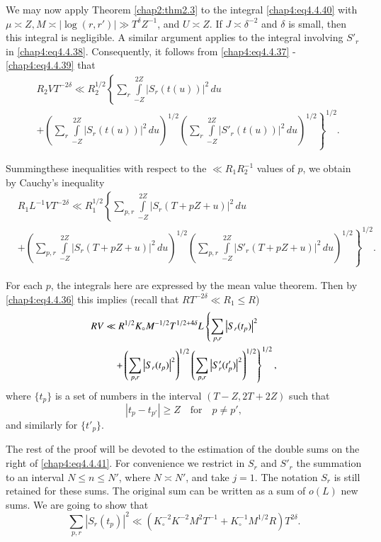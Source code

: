 We may now apply Theorem \ref{chap2:thm2.3} to the integral \eqref{chap4:eq4.4.40} with $\mu\asymp Z, M\asymp |\log(r,r')|\gg T^\delta Z^{-1}$, and $U\asymp Z$. If $J\asymp\delta^{-2}$ and $\delta$ is small, then this integral is negligible. A similar argument applies to the integral involving $S'_r$ in \eqref{chap4:eq4.4.38}. Consequently, it follows from \eqref{chap4:eq4.4.37} - \eqref{chap4:eq4.4.39} that 
\begin{align*}
& R_2VT^{-2\delta}\ll R_2^{1/2}\left\{\sum\limits_r\int\limits_{-Z}^{2Z}\left| S_r(t(u))\right|^2\,du\right.\\
& +\left.\left(\sum\limits_r\int\limits_{-Z}^{2Z}\left|S_r(t(u))\right|^2\,du \right)^{1/2}\left(\sum\limits_r\int\limits_{-Z}^{2Z}\left|S'_r(t(u))\right|^2\, du\right)^{1/2}\right\}^{1/2}.
\end{align*}

Summing\pageoriginale these inequalities with respect to the $\ll R_1R_2^{-1}$ values of $p$, we obtain by Cauchy's inequality
{\fontsize{10}{12}\selectfont
\begin{align*}
& R_1L^{-1}VT^{-2\delta}\ll R_1^{1/2}\left\{\sum\limits_{p,r}\int\limits_{-Z}^{2Z} \left|S_r(T+pZ+u)\right|^2\,du\right.\\
& +\left.\left(\sum\limits_{p,r}\int\limits_{-Z}^{2Z}\left|S_r(T+pZ+u)\right|^2 \, du\right)^{1/2}\left(\sum\limits_{p,r}\int\limits_{-Z}^{2Z}\left|S'_r(T+pZ+u) \right|^2\,du\right)^{1/2}\right\}^{1/2}.
\end{align*}}

For each $p$, the integrals here are expressed by the mean value theorem. Then by \eqref{chap4:eq4.4.36} this implies (recall that $RT^{-2\delta}\ll R_1\leq R$)
\begin{align}
RV & \ll R^{1/2}K_\circ M^{-1/2}T^{1/2+4\delta}L\left\{\sum\limits_{p,r}\left|S_r (t_p)\right|^2\right.\label{chap4:eq4.4.41}\\
&\quad \left.+\left(\sum\limits_{p,r}\left|S_r(t_p)\right|^2\right)^{1/2}\left( \sum\limits_{p,r}\left|S'_r(t'_p)\right|^2\right)^{1/2}\right\}^{1/2},\notag
\end{align}
where $\{t_p\}$ is a set of numbers in the interval $(T-Z,2T+2Z)$ such that 
\begin{equation}\label{chap4:eq4.4.42}
\left|t_p-t_{p'}\right|\geq Z\quad\text{for}\quad p\neq p',
\end{equation}
and similarly for $\{t'_p\}$. 

The rest of the proof will be devoted to the estimation of the double
sums on the right of \eqref{chap4:eq4.4.41}. For convenience we
restrict in $S_r$ and $S'_r$ the summation to an interval $N\leq n\leq
N'$, where $N\asymp N'$, and take $j=1$. The notation $S_r$ is still
retained for these sums. The original sum can be written as a sum of
$o(L)$ new sums. We are going to show that  
\begin{equation}\label{chap4:eq4.4.43}
\sum\limits_{p,r}\left|S_r(t_p)\right|^2\ll \left(K_\circ^{-2}K^{-2}M^2T^{-1}+ K_\circ^{-1}M^{1/2}R\right)T^{2\delta}.
\end{equation}

